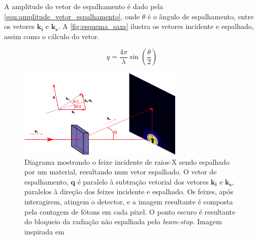 		A amplitude do vetor de espalhamento é dado pela \autoref{eqn:amplitude_vetor_espalhamento}, onde \(\theta\) é o ângulo de espalhamento, entre os vetores \(\mathbf{k_i}\) e \(\mathbf{k_s}\). A \autoref{fig:esquema_saxs} ilustra os vetores incidente e espalhado, assim como o cálculo do vetor.\cite{Glatter2018livro}
		
		\begin{equation}
		q = \dfrac{4\pi}{\lambda} \sin\left(\dfrac{\theta}{2}\right)
		\label{eqn:amplitude_vetor_espalhamento}
		\end{equation} 
		

		\begin{figure}[h]
			\centering
			\includegraphics[width=0.7\textwidth]{imagens/saxs/Esquema_SAXS}
			\caption{Diagrama mostrando o feixe incidente de raios-X sendo espalhado por um material, resultando num vetor espalhado. O vetor de espalhamento, \(\mathbf{q}\) é paralelo à subtração vetorial dos vetores \( \mathbf{k_i} \) e \( \mathbf{k_s} \), paralelos à direção dos feixes incidente e espalhado. Os feixes, após interagirem, atingem o detector, e a imagem resultante é composta pela contagem de fótons em cada pixel. O ponto escuro é resultante do bloqueio da radiação não espalhada pelo \emph{beam-stop}. Imagem inspirada em \citeauthor{Narayanan2008a}}
			\label{fig:esquema_saxs}
		\end{figure}
		
